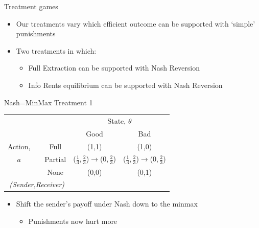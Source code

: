 \documentclass{beamer}
\begin{document}
\begin{frame}{Treatment games }
\begin{itemize}
\item Our treatments vary which efficient outcome can be supported with
`simple' punishments
\item Two treatments in which:
\begin{itemize}
\item Full Extraction can be supported with Nash Reversion
\item Info Rents equilibrium can be supported with Nash Reversion
\end{itemize}
\end{itemize}
\end{frame}

\begin{frame}{Nash=MinMax Treatment 1}
\begin{center}

\begin{tabular}{c|cc|c|c|}
\multicolumn{1}{c}{} &  & \multicolumn{1}{c}{} & \multicolumn{2}{c}{State, $\theta$} \\ 
\cline{4-5} 
\multicolumn{1}{c}{} &  & \multicolumn{1}{c}{} & \multicolumn{1}{c}{Good} & \multicolumn{1}{c}{Bad} \\ 
\cline{4-5} 
Action, &  & Full & (1,1) & (1,0) \\ 
\cline{4-5} 
$a$ &  & Partial & ($\frac{1}{3},\frac{2}{3}$)$\rightarrow$($0,\frac{2}{3}$) & ($\frac{1}{3},\frac{2}{3}$)$\rightarrow$($0,\frac{2}{3}$) \\ 
\cline{4-5} 
 &  & None & (0,0) & (0,1) \\ 
\cline{4-5} 
\multicolumn{3}{c}{\emph{(Sender,Receiver)}} & \multicolumn{1}{c}{} & \multicolumn{1}{c}{} \\ 
\end{tabular}
\begin{itemize}
\item Shift the sender's payoff under Nash down to the minmax
\begin{itemize}
\item Punishments now hurt more
\end{itemize}
\end{itemize}
\end{center}
\end{frame}
\end{document}
